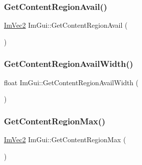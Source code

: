 \hypertarget{namespace_im_gui_a410c8e19b2fea8b52746ca11b3930301}{}\label{namespace_im_gui_a410c8e19b2fea8b52746ca11b3930301} 
\subsubsection{\texorpdfstring{Get\+Content\+Region\+Avail()}{GetContentRegionAvail()}}
{\footnotesize\ttfamily \hyperlink{struct_im_vec2}{Im\+Vec2} Im\+Gui\+::\+Get\+Content\+Region\+Avail (\begin{DoxyParamCaption}{ }\end{DoxyParamCaption})}

\hypertarget{namespace_im_gui_a52e3311f46626a5d0369139d20da993a}{}\label{namespace_im_gui_a52e3311f46626a5d0369139d20da993a} 
\subsubsection{\texorpdfstring{Get\+Content\+Region\+Avail\+Width()}{GetContentRegionAvailWidth()}}
{\footnotesize\ttfamily float Im\+Gui\+::\+Get\+Content\+Region\+Avail\+Width (\begin{DoxyParamCaption}{ }\end{DoxyParamCaption})}

\hypertarget{namespace_im_gui_a0a4dbfabbfa45d74319ef541962ce2eb}{}\label{namespace_im_gui_a0a4dbfabbfa45d74319ef541962ce2eb} 
\subsubsection{\texorpdfstring{Get\+Content\+Region\+Max()}{GetContentRegionMax()}}
{\footnotesize\ttfamily \hyperlink{struct_im_vec2}{Im\+Vec2} Im\+Gui\+::\+Get\+Content\+Region\+Max (\begin{DoxyParamCaption}{ }\end{DoxyParamCaption})}

\hypertarget{namespace_im_gui_af557a6de5538099a0f6047eb994bbf42}{}\label{namespace_im_gui_af557a6de5538099a0f6047eb994bbf42} 
